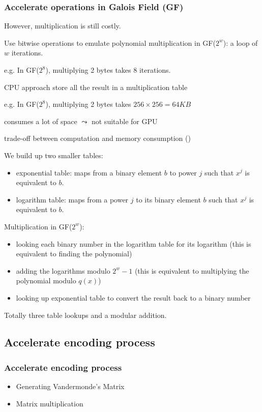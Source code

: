 \documentclass[slidestop,compress,mathserif]{beamer}
\begin{document}
\begin{frame}[options]
\frametitle{Accelerate operations in Galois Field (GF)}
{
However, multiplication is still costly.

Use bitwise operations to emulate polynomial multiplication in GF($2^w$): a loop of $w$ iterations.

e.g. 
In GF($2^8$), multiplying 2 bytes takes 8 iterations.
}

{
\begin{block}{CPU approach}
store all the result in a multiplication table
\end{block}

e.g. 
In GF($2^8$), multiplying 2 bytes takes $256 \times 256=64KB$

consumes a lot of space $\leadsto$ not suitable for GPU
}

{
trade-off between computation and memory consumption (\cite{plank1997tutorial})

We build up two smaller tables:
\begin{itemize}
  \item exponential table: maps from a binary element $b$ to power $j$ such that $x^j$ is equivalent to $b$.
  \item logarithm table: maps from a power $j$ to its binary element $b$ such that $x^j$ is equivalent to $b$.
\end{itemize}

Multiplication in GF($2^w$):
\begin{itemize}
  \item looking each binary number in the logarithm table for its logarithm (this is equivalent to finding the polynomial)
  \item adding the logarithms modulo $2^w-1$ (this is equivalent to multiplying the polynomial modulo $q(x)$)
  \item looking up exponential table to convert the result back to a binary number
\end{itemize}
Totally three table lookups and a modular addition.
}
\end{frame}



\subsection{Accelerate encoding process}
\begin{frame}[options]
\frametitle{Accelerate encoding process}
\begin{itemize}
  \item Generating Vandermonde's Matrix
  \item Matrix multiplication
\end{itemize}
\end{frame}
\end{document}
